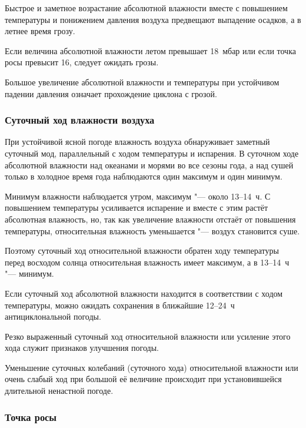  Быстрое и заметное возрастание абсолютной влажности вместе с
повышением температуры и понижением давления воздуха предвещают
выпадение осадков, а в летнее время грозу.

 Если величина абсолютной влажности летом превышает 18~мбар или
если точка росы превысит 16\grC, следует ожидать грозы.

 Большое увеличение абсолютной влажности и температуры при
устойчивом падении давления означает прохождение циклона с грозой.

\subsubsection{Суточный ход влажности воздуха}

При устойчивой ясной погоде влажность воздуха обнаруживает заметный
суточный мод, параллельный с ходом температуры и испарения. В суточном
ходе абсолютной влажности над океанами и морями во все сезоны года, а
над сушей только в холодное время года наблюдаются один максимум и
один минимум.

Минимум влажности наблюдается утром, максимум "--- около 13--14~ч. С
повышением температуры усиливается испарение и вместе с этим растёт
абсолютная влажность, но, так как увеличение влажности отстаёт от
повышения температуры, относительная влажность уменьшается "--- воздух
становится суше.

Поэтому суточный ход относительной влажности обратен ходу температуры
перед восходом солнца относительная влажность имеет максимум, а в
13--14~ч "--- минимум.

 Если суточный ход абсолютной влажности находится в
соответствии с ходом температуры, можно ожидать сохранения в ближайшие
12--24~ч антициклональной погоды.

 Резко выраженный суточный ход относительной влажности или
усиление этого хода служит признаков улучшения погоды.

 Уменьшение суточных колебаний (суточного хода) относительной
влажности или очень слабый ход при большой её величине происходит при
установившейся длительной ненастной погоде.

\subsubsection{Точка росы}

